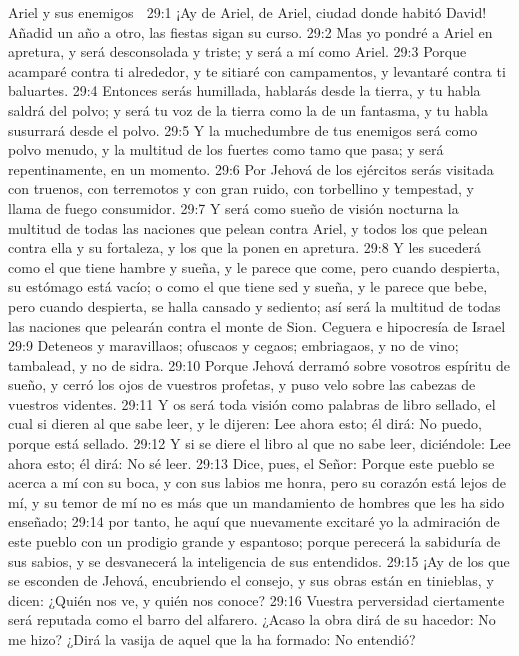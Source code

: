Ariel y sus enemigos  

29:1 ¡Ay de Ariel, de Ariel, ciudad donde habitó David! Añadid un año a otro, las fiestas sigan su curso.  
29:2 Mas yo pondré a Ariel en apretura, y será desconsolada y triste; y será a mí como Ariel.  
29:3 Porque acamparé contra ti alrededor, y te sitiaré con campamentos, y levantaré contra ti baluartes.  
29:4 Entonces serás humillada, hablarás desde la tierra, y tu habla saldrá del polvo; y será tu voz de la tierra como la de un fantasma, y tu habla susurrará desde el polvo.  
29:5 Y la muchedumbre de tus enemigos será como polvo menudo, y la multitud de los fuertes como tamo que pasa; y será repentinamente, en un momento.  
29:6 Por Jehová de los ejércitos serás visitada con truenos, con terremotos y con gran ruido, con torbellino y tempestad, y llama de fuego consumidor.  
29:7 Y será como sueño de visión nocturna la multitud de todas las naciones que pelean contra Ariel, y todos los que pelean contra ella y su fortaleza, y los que la ponen en apretura.  
29:8 Y les sucederá como el que tiene hambre y sueña, y le parece que come, pero cuando despierta, su estómago está vacío; o como el que tiene sed y sueña, y le parece que bebe, pero cuando despierta, se halla cansado y sediento; así será la multitud de todas las naciones que pelearán contra el monte de Sion.  
Ceguera e hipocresía de Israel  
29:9 Deteneos y maravillaos; ofuscaos y cegaos; embriagaos, y no de vino; tambalead, y no de sidra.  
29:10 Porque Jehová derramó sobre vosotros espíritu de sueño, y cerró los ojos de vuestros profetas, y puso velo sobre las cabezas de vuestros videntes.  
29:11 Y os será toda visión como palabras de libro sellado, el cual si dieren al que sabe leer, y le dijeren: Lee ahora esto; él dirá: No puedo, porque está sellado.  
29:12 Y si se diere el libro al que no sabe leer, diciéndole: Lee ahora esto; él dirá: No sé leer.  
29:13 Dice, pues, el Señor: Porque este pueblo se acerca a mí con su boca, y con sus labios me honra, pero su corazón está lejos de mí, y su temor de mí no es más que un mandamiento de hombres que les ha sido enseñado;  
29:14 por tanto, he aquí que nuevamente excitaré yo la admiración de este pueblo con un prodigio grande y espantoso; porque perecerá la sabiduría de sus sabios, y se desvanecerá la inteligencia de sus entendidos. 
29:15 ¡Ay de los que se esconden de Jehová, encubriendo el consejo, y sus obras están en tinieblas, y dicen: ¿Quién nos ve, y quién nos conoce?  
29:16 Vuestra perversidad ciertamente será reputada como el barro del alfarero. ¿Acaso la obra dirá de su hacedor: No me hizo? ¿Dirá la vasija de aquel que la ha formado: No entendió?  
